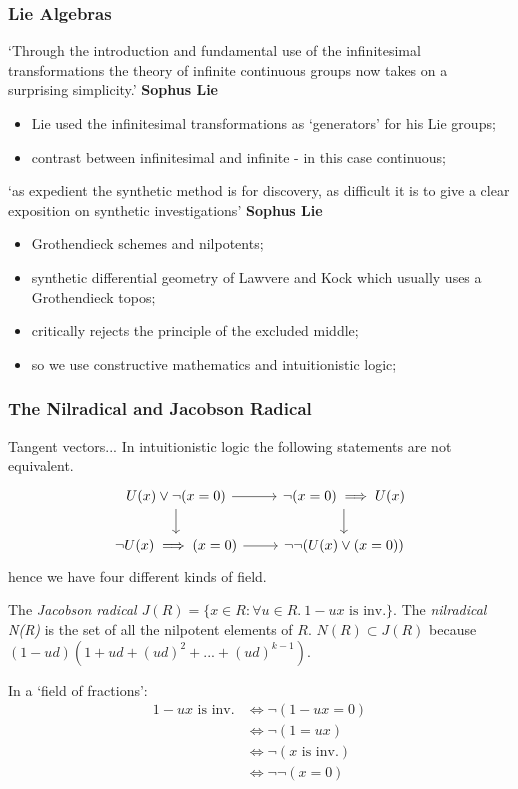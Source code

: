 \documentclass[]{beamer}
\begin{document}
\begin{frame}[fragile]\frametitle{Lie Algebras}
    `Through the introduction and fundamental use of the infinitesimal transformations the theory of infinite continuous groups now takes on a surprising simplicity.' \textbf{Sophus Lie}
    \begin{itemize}
        \item Lie used the infinitesimal transformations as `generators' for his Lie groups;
        \item contrast between infinitesimal and infinite - in this case continuous;
    \end{itemize}
    `as expedient the synthetic method is for discovery, as difficult it is to give a clear exposition on synthetic investigations' \textbf{Sophus Lie}
    \begin{itemize}
        \item Grothendieck schemes and nilpotents;
        \item synthetic differential geometry of Lawvere and Kock which usually uses a Grothendieck topos;
        \item critically rejects the principle of the excluded middle;
        \item so we use constructive mathematics and intuitionistic logic;
    \end{itemize}
\end{frame}

\begin{frame}[fragile]\frametitle{The Nilradical and Jacobson Radical}
    Tangent vectors...
In intuitionistic logic the following statements are not equivalent.
\begin{equation*}
    \begin{tikzcd}
        U(x)\vee \neg (x=0) \rar \dar & \neg(x=0)\implies U(x)\dar \\
        \neg U(x) \implies (x=0) \rar & \neg\neg(U(x)\vee (x=0))
    \end{tikzcd}
\end{equation*}
hence we have four different kinds of field.
\begin{definition}
    The \emph{Jacobson radical $J(R)=\{x\in R: \forall u\in R.~ 1-ux\text{ is inv.}\}$}.
    The \emph{nilradical N(R)} is the set of all the nilpotent elements of $R$.
    $N(R)\subset J(R)$ because $(1-ud)(1+ud+(ud)^2+...+(ud)^{k-1})$.
\end{definition}
In a `field of fractions':
\begin{align*}
    1-ux\text{ is inv.}&\iff \neg(1-ux=0)\\
    &\iff \neg(1=ux)\\
    &\iff \neg(x\text{ is inv.})\\
    &\iff \neg\neg(x=0)
\end{align*}
\end{frame}
\end{document}
